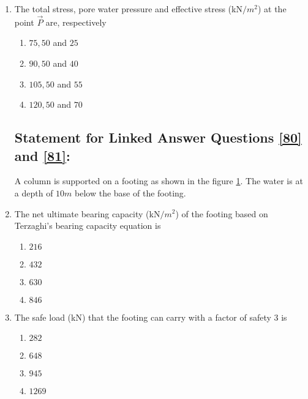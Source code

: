 \documentclass[journal]{IEEEtran}
\begin{document}
\begin{enumerate}
    \item \label{79} The total stress, pore water pressure and effective stress (kN$/m^2$) at the point $\vec{P}$ are, respectively
        \begin{enumerate}
            \item $75,50$ and $25$
            \item $90,50$ and $40$
            \item $105,50$ and $55$
            \item $120,50$ and $70$
        \end{enumerate}
    \subsection*{Statement for Linked Answer Questions \ref{80} and \ref{81}:}
    A column is supported on a footing as shown in the figure \ref{80-81}. The water is at a depth of $10m$ below the base of the footing.
    \begin{figure}[H]
        \centering
        
        \caption{}
        \label{80-81}
    \end{figure}
    \item \label{80} The net ultimate bearing capacity (kN$/m^2$) of the footing based on Terzaghi's bearing capacity equation is
        \begin{enumerate}
            \item $216$
            \item $432$
            \item $630$
            \item $846$
        \end{enumerate}

    \item \label{81} The safe load (kN) that the footing can carry with a factor of safety $3$ is 
        \begin{enumerate}
            \item $282$
            \item $648$
            \item $945$
            \item $1269$
        \end{enumerate}


\end{enumerate}
\end{document}
